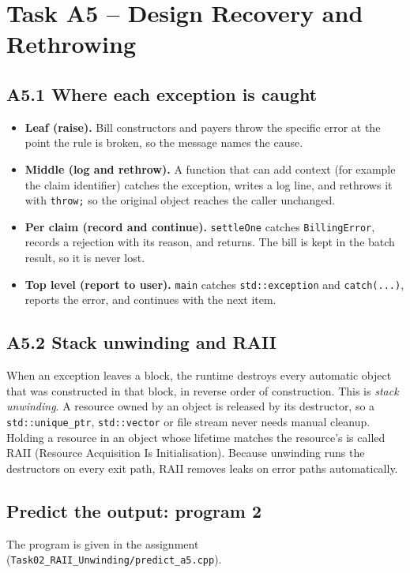 \documentclass[11pt,a4paper]{article}
\begin{document}
\section{Task A5 -- Design Recovery and Rethrowing}
\subsection*{A5.1 Where each exception is caught}
\begin{itemize}[nosep]
\item \textbf{Leaf (raise).} Bill constructors and payers throw the specific error at the point the rule is broken, so the message names the cause.
\item \textbf{Middle (log and rethrow).} A function that can add context (for example the claim identifier) catches the exception, writes a log line, and rethrows it with \texttt{throw;} so the original object reaches the caller unchanged.
\item \textbf{Per claim (record and continue).} \texttt{settleOne} catches \texttt{BillingError}, records a rejection with its reason, and returns. The bill is kept in the batch result, so it is never lost.
\item \textbf{Top level (report to user).} \texttt{main} catches \texttt{std::exception} and \texttt{catch(...)}, reports the error, and continues with the next item.
\end{itemize}

\subsection*{A5.2 Stack unwinding and RAII}
When an exception leaves a block, the runtime destroys every automatic object that was constructed in that block, in reverse order of construction. This is \emph{stack unwinding}. A resource owned by an object is released by its destructor, so a \texttt{std::unique\_ptr}, \texttt{std::vector} or file stream never needs manual cleanup. Holding a resource in an object whose lifetime matches the resource's is called RAII (Resource Acquisition Is Initialisation). Because unwinding runs the destructors on every exit path, RAII removes leaks on error paths automatically.

\subsection*{Predict the output: program 2}
The program is given in the assignment (\texttt{Task02\_RAII\_Unwinding/predict\_a5.cpp}).
\end{document}
